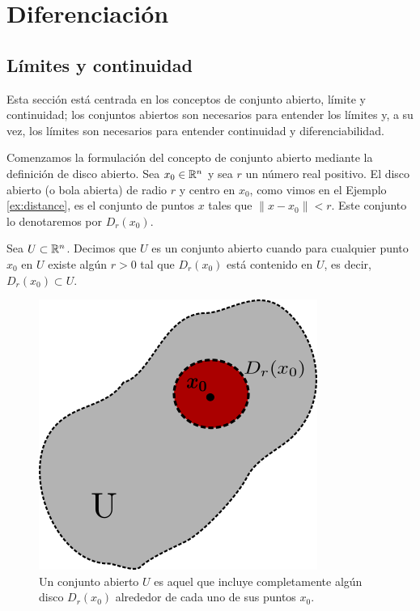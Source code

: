 \chapter{Diferenciación}\label{ch:diferenciacion}
\section{Límites y continuidad}

Esta sección está centrada en los conceptos de conjunto abierto, límite y continuidad; los conjuntos abiertos son necesarios para entender los límites y, a su vez, los límites son necesarios para entender continuidad y diferenciabilidad.

Comenzamos la formulación del concepto de conjunto abierto mediante la definición de disco abierto. Sea $x_{0}
\in  \mathbb{R}^{n}$ y sea $r$ un número real positivo. El disco abierto (o bola abierta) de radio $r$ y centro 
en $x_{0}$, como vimos en el Ejemplo \ref{ex:distance}, es el conjunto de puntos $x$ tales que $\|x-x_{0}\| < r $.
Este conjunto lo denotaremos por $D_{r}(x_{0})$.

\begin{definition}
    Sea $U \subset \mathbb{R}^{n}$. Decimos que $U$ es un conjunto abierto cuando para cualquier punto $x_{0}$ en $U$ existe algún $r>0$
    tal que $D_{r}(x_{0})$ está contenido en $U$, es decir, $D_{r}(x_{0}) \subset U$.
\end{definition}

\begin{figure}[!ht]
  \begin{center}
      \includegraphics[width=0.5\linewidth]{gfx/conjunto-abierto}
      \caption{Un conjunto abierto $U$ es aquel que incluye completamente algún disco $D_{r}(x_{0})$ alrededor
      de cada uno de sus puntos $x_{0}$.}
      \label{fig:boat1}
  \end{center}
\end{figure}

